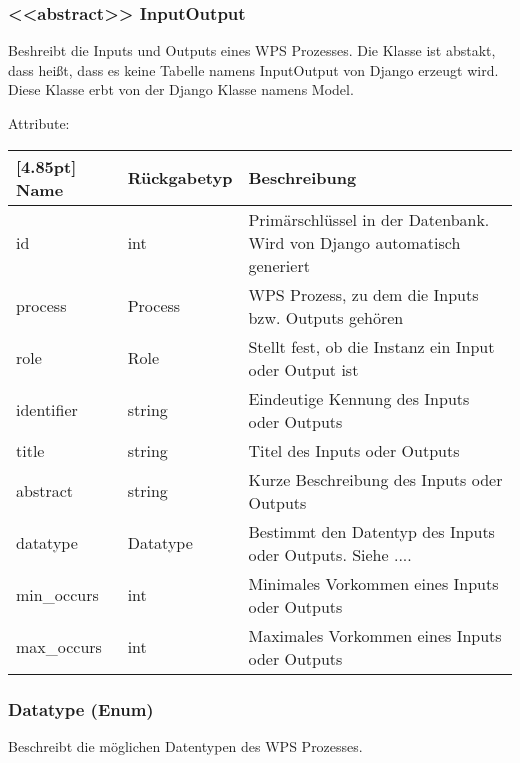 		\subsubsection{<<abstract>> InputOutput}
			Beshreibt die Inputs und Outputs eines WPS Prozesses. Die Klasse ist abstakt, dass heißt, dass es keine Tabelle namens InputOutput von Django erzeugt wird. \newline
			Diese Klasse erbt von der Django Klasse namens \glqq Model\grqq .
			
			Attribute:
			\begin{center}
				\setlength\tabcolsep{5pt}
				\renewcommand{\arraystretch}{1.5}
				
				\begin{tabularx}{\textwidth}{|l|l|X|}
					\hline
					\rowcolor[gray]{0.75}[4.85pt]
					Name & Rückgabetyp & Beschreibung \\ \hline 
					id & int & Primärschlüssel in der Datenbank. Wird von Django automatisch generiert \\ \hline
					process & Process & WPS Prozess, zu dem die Inputs bzw. Outputs gehören \\ \hline
					role & Role & Stellt fest, ob die Instanz ein Input oder Output ist \\ \hline
					identifier & string & Eindeutige Kennung des Inputs oder Outputs \\ \hline
					title & string & Titel des Inputs oder Outputs \\ \hline
					abstract & string & Kurze Beschreibung des Inputs oder Outputs \\ \hline
					datatype & Datatype & Bestimmt den Datentyp des Inputs oder Outputs. 
					Siehe .... \\ \hline
					min\_occurs & int & Minimales Vorkommen eines Inputs oder Outputs \\ \hline
					max\_occurs & int & Maximales Vorkommen eines Inputs oder Outputs \\ \hline
				\end{tabularx}
			\end{center}
			
        \subsubsection{Datatype (Enum)}	
			Beschreibt die möglichen Datentypen des WPS Prozesses. \newline
			
